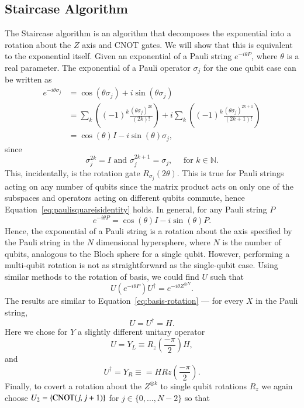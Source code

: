 \subsection{Staircase Algorithm}%
\label{ssub:StaircaseAlgorithm}
The Staircase algorithm is an algorithm that decomposes the exponential into a rotation about the $ Z $ axis and CNOT gates. We will show that this is equivalent to the exponential itself. 
Given an exponential of a Pauli string $ e^{-i\theta P} $, where $ \theta $ is a real parameter. The exponential of a Pauli operator $ \sigma_j $  for the one qubit case can be written as
\begin{align}
	\label{eq:ExpPauli}
	 e^{-i\theta \sigma_j} &= \cos(\theta \sigma_j) + i \sin(\theta \sigma_j) \\
	&= \sum_k \left(   (-1)^k \frac{(\theta \sigma_j)^{2k}}{(2k)!}  \right) +  i \sum_k \left((-1)^k \frac{(\theta \sigma_j)^{2k+1}}{(2k+1)!} \right)\\
		&= \cos(\theta)I - i\sin(\theta)\sigma_j,
\end{align}
since
\begin{equation}
	\label{eq:paulisquareisidentity}
	\sigma_j^{2k} = I  \text{ and }  \sigma_j^{2k+1} = \sigma_j,  \quad \text{ for } k \in \mathbb{N}.
\end{equation}
This, incidentally, is the rotation gate $ R_{\sigma_j}(2\theta)$.
This is true for Pauli strings acting on any number of qubits since the matrix product acts on only one of the subspaces and operators acting on different qubits commute, hence Equation~\eqref{eq:paulisquareisidentity} holds. In general, for any Pauli string $ P $ 
\begin{equation}
	\label{eq:multiqubitrotation}
	e^{-i\theta P} = \cos(\theta)I - i\sin(\theta)P.
\end{equation}
Hence, the exponential of a Pauli string is a rotation about the axis specified by the Pauli string in the $ N $ dimensional hypersphere, where $ N $ is the number of qubits, analogous to the Bloch sphere for a single qubit. However, performing a multi-qubit rotation is not as straightforward as the single-qubit case. Using similar methods to the rotation of basis, we could find $ U $ such that
\[ U(e^{-i\theta P})U^{\dagger} = e^{-i\theta Z^{\otimes N}}. \] 
The results are similar to Equation~\eqref{eq:basis-rotation} --- for every $ X $ in the Pauli string, \[ U=U^{\dagger}=H. \] 
Here we chose for $ Y $ a slightly different unitary operator \[ U=Y_L \equiv R_z\left( \frac{-\pi}{2} \right)H, \] and \[ U^{\dagger} = Y_R \equiv = H Rz(\frac{-\pi}{2}). \]
Finally, to covert a rotation about the $ Z^{\otimes k} $ to single qubit rotations $ R_z $ we again choose $ U_2=\{\text{CNOT}(j,j+1)\}$ for $ j \in \{0, \ldots, N-2\} $ so that

